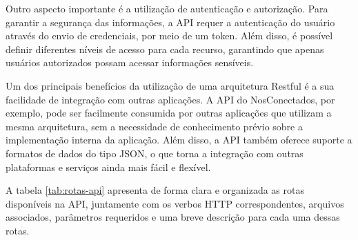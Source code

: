 \documentclass[tcc,capa]{texufpel}
\begin{document}
Outro aspecto importante é a utilização de autenticação e autorização. Para garantir a segurança das informações, a API requer a autenticação do usuário através do envio de credenciais, por meio de um token. Além disso, é possível definir diferentes níveis de acesso para cada recurso, garantindo que apenas usuários autorizados possam acessar informações sensíveis.

Um dos principais benefícios da utilização de uma arquitetura Restful é a sua facilidade de integração com outras aplicações. A API do NosConectados, por exemplo, pode ser facilmente consumida por outras aplicações que utilizam a mesma arquitetura, sem a necessidade de conhecimento prévio sobre a implementação interna da aplicação. Além disso, a API também oferece suporte a formatos de dados do tipo JSON, o que torna a integração com outras plataformas e serviços ainda mais fácil e flexível.

A tabela \ref{tab:rotas-api} apresenta de forma clara e organizada as rotas disponíveis na API, juntamente com os verbos HTTP correspondentes, arquivos associados, parâmetros requeridos e uma breve descrição para cada uma dessas rotas.
\end{document}
